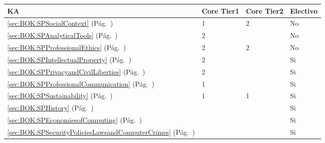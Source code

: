 \begin{center}
\begin{tabularx}{\textwidth}{|X|p{1cm}|p{1cm}|p{1.4cm}|}\hline
\textbf{\acf{KA}} & \textbf{Core Tier1} & \textbf{Core Tier2} & \textbf{Electivo} \\ \hline
\ref{sec:BOK:SPSocialContext} \htmlref{\SPSocialContext}{sec:BOK:SPSocialContext}\xspace (Pág.~\pageref{sec:BOK:SPSocialContext}) & 1 & 2 & No \\ \hline
\ref{sec:BOK:SPAnalyticalTools} \htmlref{\SPAnalyticalTools}{sec:BOK:SPAnalyticalTools}\xspace (Pág.~\pageref{sec:BOK:SPAnalyticalTools}) & 2 & ~ & No \\ \hline
\ref{sec:BOK:SPProfessionalEthics} \htmlref{\SPProfessionalEthics}{sec:BOK:SPProfessionalEthics}\xspace (Pág.~\pageref{sec:BOK:SPProfessionalEthics}) & 2 & 2 & No \\ \hline
\ref{sec:BOK:SPIntellectualProperty} \htmlref{\SPIntellectualProperty}{sec:BOK:SPIntellectualProperty}\xspace (Pág.~\pageref{sec:BOK:SPIntellectualProperty}) & 2 & ~ & Si \\ \hline
\ref{sec:BOK:SPPrivacyandCivilLiberties} \htmlref{\SPPrivacyandCivilLiberties}{sec:BOK:SPPrivacyandCivilLiberties}\xspace (Pág.~\pageref{sec:BOK:SPPrivacyandCivilLiberties}) & 2 & ~ & Si \\ \hline
\ref{sec:BOK:SPProfessionalCommunication} \htmlref{\SPProfessionalCommunication}{sec:BOK:SPProfessionalCommunication}\xspace (Pág.~\pageref{sec:BOK:SPProfessionalCommunication}) & 1 & ~ & Si \\ \hline
\ref{sec:BOK:SPSustainability} \htmlref{\SPSustainability}{sec:BOK:SPSustainability}\xspace (Pág.~\pageref{sec:BOK:SPSustainability}) & 1 & 1 & Si \\ \hline
\ref{sec:BOK:SPHistory} \htmlref{\SPHistory}{sec:BOK:SPHistory}\xspace (Pág.~\pageref{sec:BOK:SPHistory}) & ~ & ~ & Si \\ \hline
\ref{sec:BOK:SPEconomiesofComputing} \htmlref{\SPEconomiesofComputing}{sec:BOK:SPEconomiesofComputing}\xspace (Pág.~\pageref{sec:BOK:SPEconomiesofComputing}) & ~ & ~ & Si \\ \hline
\ref{sec:BOK:SPSecurityPoliciesLawsandComputerCrimes} \htmlref{\SPSecurityPoliciesLawsandComputerCrimes}{sec:BOK:SPSecurityPoliciesLawsandComputerCrimes}\xspace (Pág.~\pageref{sec:BOK:SPSecurityPoliciesLawsandComputerCrimes}) & ~ & ~ & Si \\ \hline
\end{tabularx}
\end{center}
